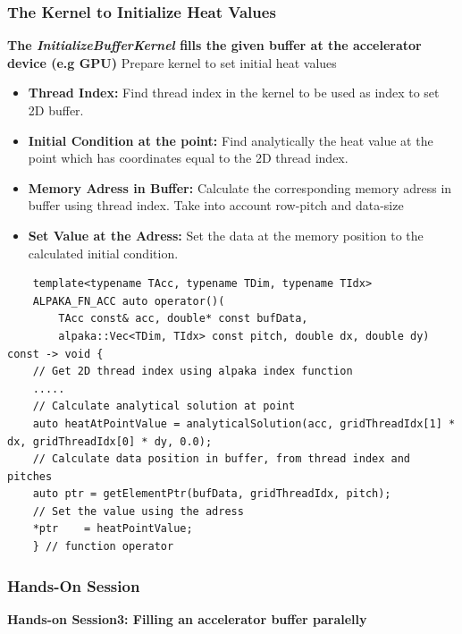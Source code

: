 \documentclass[9pt]{beamer}
\begin{document}
\begin{frame}[fragile]
\frametitle{The Kernel to Initialize Heat Values}
\small

\textbf{ The \textit{InitializeBufferKernel} fills the given buffer at the accelerator device (e.g GPU)}
    \lstset{basicstyle=\ttfamily\scriptsize}
    Prepare kernel to set initial heat values
    \begin{itemize}
    \item \textbf{Thread Index:} Find thread index in the kernel to be used as index to set 2D buffer.
    \item \textbf{Initial Condition at the point:} Find analytically the heat value at the point which has coordinates equal to the 2D thread index.
    \item \textbf{Memory Adress in Buffer:} Calculate the corresponding memory adress in buffer using thread index. Take into account row-pitch and data-size
    \item \textbf{Set Value at the Adress:} Set the data at the memory position to the calculated initial condition.
    \end{itemize}
     \lstset{basicstyle=\ttfamily\tiny}
    \begin{lstlisting}
    template<typename TAcc, typename TDim, typename TIdx>
    ALPAKA_FN_ACC auto operator()(
        TAcc const& acc, double* const bufData,
        alpaka::Vec<TDim, TIdx> const pitch, double dx, double dy) const -> void {
    // Get 2D thread index using alpaka index function
    .....
    // Calculate analytical solution at point
    auto heatAtPointValue = analyticalSolution(acc, gridThreadIdx[1] * dx, gridThreadIdx[0] * dy, 0.0);
    // Calculate data position in buffer, from thread index and pitches
    auto ptr = getElementPtr(bufData, gridThreadIdx, pitch);
    // Set the value using the adress
    *ptr    = heatPointValue;
    } // function operator
    \end{lstlisting}

\end{frame}





\begin{frame}
\frametitle{Hands-On Session}
\begin{center}
      \Huge \textbf{Hands-on Session3: Filling an accelerator buffer paralelly}
  \end{center}
\end{frame}
\end{document}
